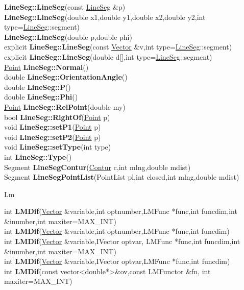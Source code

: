 \documentclass[10pt,titlepage]{article}
\def\functionlistentry#1#2#3#4#5#6{\noindent #1 {\bf #2}(#3) \dotfill #6\\}
\def\letterref#1{}
\def\letterlabel#1{\vspace{0.5cm}\centerline{\Large #1}}
\def\letterlabelend#1{}
\begin{document}
{{\functionlistentry{}{LineSeg::LineSeg}{const \hyperlink{LineSeg}{LineSeg} \&p}{553}{geoObject}{}
\functionlistentry{}{LineSeg::LineSeg}{double x1,double y1,double x2,double y2,int type=\hyperlink{LineSeg}{LineSeg}::segment}{554}{geoObject}{}
\functionlistentry{}{LineSeg::LineSeg}{double p,double phi}{555}{geoObject}{}
\functionlistentry{explicit}{LineSeg::LineSeg}{const \hyperlink{Vector}{Vector} \&v,int type=\hyperlink{LineSeg}{LineSeg}::segment}{556}{geoObject}{}
\functionlistentry{explicit}{LineSeg::LineSeg}{double d[],int type=\hyperlink{LineSeg}{LineSeg}::segment}{557}{geoObject}{}
\functionlistentry{\hyperlink{Point}{Point}}{LineSeg::Normal}{}{579}{geoObject}{}
\functionlistentry{double}{LineSeg::OrientationAngle}{}{569}{geoObject}{}
\functionlistentry{double}{LineSeg::P}{}{567}{geoObject}{}
\functionlistentry{double}{LineSeg::Phi}{}{568}{geoObject}{}
\functionlistentry{\hyperlink{Point}{Point}}{LineSeg::RelPoint}{double my}{564}{geoObject}{}
\functionlistentry{bool}{LineSeg::RightOf}{\hyperlink{Point}{Point} p}{571}{geoObject}{}
\functionlistentry{void}{LineSeg::setP1}{\hyperlink{Point}{Point} p}{560}{geoObject}{}
\functionlistentry{void}{LineSeg::setP2}{\hyperlink{Point}{Point} p}{561}{geoObject}{}
\functionlistentry{void}{LineSeg::setType}{int type}{563}{geoObject}{}
\functionlistentry{int}{LineSeg::Type}{}{562}{geoObject}{}
\functionlistentry{Segment}{LineSegContur}{\hyperlink{Contur}{Contur} c,int mlng,double mdist}{1184}{fitting}{}
\functionlistentry{Segment}{LineSegPointList}{PointList pl,int closed,int mlng,double mdist}{1189}{fitting}{}

\letterlabel{Lm}
\letterref{A}
\letterref{B}
\letterref{C}
\letterref{D}
\letterref{E}
\letterref{F}
\letterref{G}
\letterref{H}
\letterref{I}
\letterref{K}
\letterref{L}
\letterref{M}
\letterref{N}
\letterref{O}
\letterref{P}
\letterref{Q}
\letterref{R}
\letterref{S}
\letterref{T}
\letterref{U}
\letterref{V}
\letterref{W}
\letterref{X}
\letterref{Y}
\letterref{Z}

\letterref{La}
\letterref{Le}
\letterref{Li}
\letterref{Lm}
\letterref{Lo}
\letterref{Ls}
\letterref{Lu}
\letterlabelend{Lm}
\functionlistentry{int}{LMDif}{\hyperlink{Vector}{Vector} \&variable,int optnumber,LMFunc *func,int funcdim,int \&inumber,int maxiter=MAX\_INT}{1137}{matrixAlgebra}{}
\functionlistentry{int}{LMDif}{\hyperlink{Vector}{Vector} \&variable,int optnumber,LMFunc *func,int funcdim}{1138}{matrixAlgebra}{}
\functionlistentry{int}{LMDif}{\hyperlink{Vector}{Vector} \&variable,IVector optvar, LMFunc *func,int funcdim,int \&inumber,int maxiter=MAX\_INT}{1139}{matrixAlgebra}{}
\functionlistentry{int}{LMDif}{\hyperlink{Vector}{Vector} \&variable,IVector optvar,LMFunc *func,int funcdim}{1140}{matrixAlgebra}{}
\functionlistentry{int}{LMDif}{const vector\textless {}double*\textgreater  \&ov,const LMFunctor \&fn, int maxiter=MAX\_INT}{1141}{matrixAlgebra}{}

}}
\end{document}

